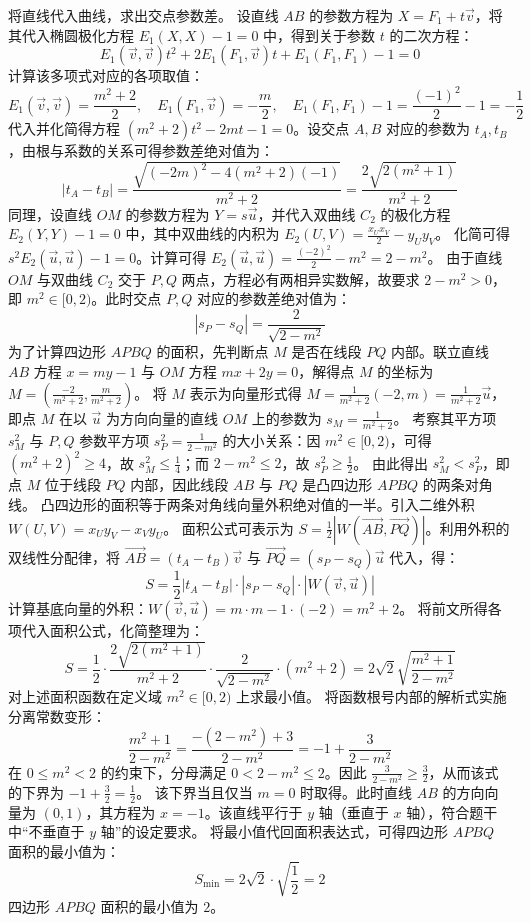 \begin{solution}
将直线代入曲线，求出交点参数差。
设直线 $AB$ 的参数方程为 $X = F_1 + t\vec{v}$，将其代入椭圆极化方程 $E_1(X, X) - 1 = 0$ 中，得到关于参数 $t$ 的二次方程：
\[ E_1(\vec{v}, \vec{v}) t^2 + 2E_1(F_1, \vec{v}) t + E_1(F_1, F_1) - 1 = 0 \]
计算该多项式对应的各项取值：
\[ E_1(\vec{v}, \vec{v}) = \frac{m^2 + 2}{2}, \quad E_1(F_1, \vec{v}) = -\frac{m}{2}, \quad E_1(F_1, F_1) - 1 = \frac{(-1)^2}{2} - 1 = -\frac{1}{2} \]
代入并化简得方程 $(m^2 + 2) t^2 - 2m t - 1 = 0$。设交点 $A, B$ 对应的参数为 $t_A, t_B$，由根与系数的关系可得参数差绝对值为：
\[ |t_A - t_B| = \frac{\sqrt{(-2m)^2 - 4(m^2 + 2)(-1)}}{m^2 + 2} = \frac{2\sqrt{2(m^2 + 1)}}{m^2 + 2} \]
同理，设直线 $OM$ 的参数方程为 $Y = s\vec{u}$，并代入双曲线 $C_2$ 的极化方程 $E_2(Y, Y) - 1 = 0$ 中，其中双曲线的内积为 $E_2(U, V) = \frac{x_U x_V}{2} - y_U y_V$。
化简可得 $s^2 E_2(\vec{u}, \vec{u}) - 1 = 0$。计算可得 $E_2(\vec{u}, \vec{u}) = \frac{(-2)^2}{2} - m^2 = 2 - m^2$。
由于直线 $OM$ 与双曲线 $C_2$ 交于 $P, Q$ 两点，方程必有两相异实数解，故要求 $2 - m^2 > 0$，即 $m^2 \in [0, 2)$。此时交点 $P, Q$ 对应的参数差绝对值为：
\[ |s_P - s_Q| = \frac{2}{\sqrt{2 - m^2}} \]
为了计算四边形 $APBQ$ 的面积，先判断点 $M$ 是否在线段 $PQ$ 内部。联立直线 $AB$ 方程 $x = my - 1$ 与 $OM$ 方程 $m x + 2y = 0$，解得点 $M$ 的坐标为 $M = \left( \frac{-2}{m^2 + 2}, \frac{m}{m^2 + 2} \right)$。
将 $M$ 表示为向量形式得 $M = \frac{1}{m^2 + 2}(-2, m) = \frac{1}{m^2 + 2}\vec{u}$，即点 $M$ 在以 $\vec{u}$ 为方向向量的直线 $OM$ 上的参数为 $s_M = \frac{1}{m^2 + 2}$。
考察其平方项 $s_M^2$ 与 $P, Q$ 参数平方项 $s_P^2 = \frac{1}{2 - m^2}$ 的大小关系：因 $m^2 \in [0, 2)$，可得 $(m^2 + 2)^2 \ge 4$，故 $s_M^2 \le \frac{1}{4}$；而 $2 - m^2 \le 2$，故 $s_P^2 \ge \frac{1}{2}$。
由此得出 $s_M^2 < s_P^2$，即点 $M$ 位于线段 $PQ$ 内部，因此线段 $AB$ 与 $PQ$ 是凸四边形 $APBQ$ 的两条对角线。
凸四边形的面积等于两条对角线向量外积绝对值的一半。引入二维外积 $W(U, V) = x_U y_V - x_V y_U$。
面积公式可表示为 $S = \frac{1}{2} |W(\overrightarrow{AB}, \overrightarrow{PQ})|$。利用外积的双线性分配律，将 $\overrightarrow{AB} = (t_A - t_B)\vec{v}$ 与 $\overrightarrow{PQ} = (s_P - s_Q)\vec{u}$ 代入，得：
\[ S = \frac{1}{2} |t_A - t_B| \cdot |s_P - s_Q| \cdot |W(\vec{v}, \vec{u})| \]
计算基底向量的外积：$W(\vec{v}, \vec{u}) = m \cdot m - 1 \cdot (-2) = m^2 + 2$。
将前文所得各项代入面积公式，化简整理为：
\[ S = \frac{1}{2} \cdot \frac{2\sqrt{2(m^2 + 1)}}{m^2 + 2} \cdot \frac{2}{\sqrt{2 - m^2}} \cdot (m^2 + 2) = 2\sqrt{2} \sqrt{\frac{m^2 + 1}{2 - m^2}} \]
对上述面积函数在定义域 $m^2 \in [0, 2)$ 上求最小值。
将函数根号内部的解析式实施分离常数变形：
\[ \frac{m^2 + 1}{2 - m^2} = \frac{-(2 - m^2) + 3}{2 - m^2} = -1 + \frac{3}{2 - m^2} \]
在 $0 \le m^2 < 2$ 的约束下，分母满足 $0 < 2 - m^2 \le 2$。因此 $\frac{3}{2 - m^2} \ge \frac{3}{2}$，从而该式的下界为 $-1 + \frac{3}{2} = \frac{1}{2}$。
该下界当且仅当 $m = 0$ 时取得。此时直线 $AB$ 的方向向量为 $(0, 1)$，其方程为 $x = -1$。该直线平行于 $y$ 轴（垂直于 $x$ 轴），符合题干中“不垂直于 $y$ 轴”的设定要求。
将最小值代回面积表达式，可得四边形 $APBQ$ 面积的最小值为：
\[ S_{\min} = 2\sqrt{2} \cdot \sqrt{\frac{1}{2}} = 2 \]
四边形 $APBQ$ 面积的最小值为 $2$。
\end{solution}


